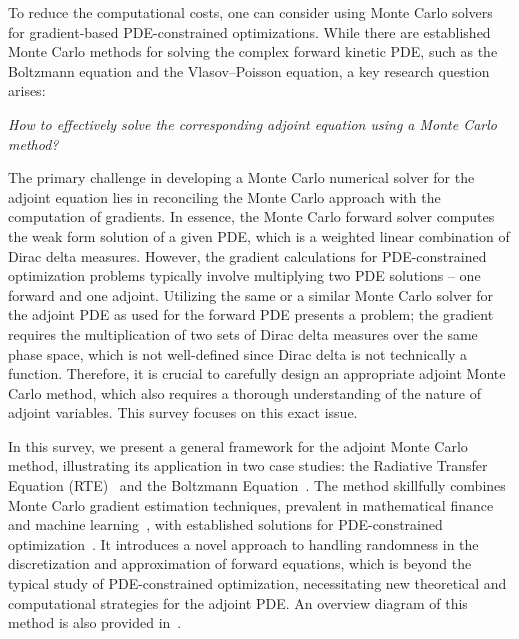 \documentclass[12pt]{amsart}
\begin{document}
To reduce the computational costs, one can consider using Monte Carlo solvers for gradient-based PDE-constrained optimizations. While there are established Monte Carlo methods for solving the complex forward kinetic PDE, such as the Boltzmann equation and the Vlasov--Poisson equation, a key research question arises: \newline
\begin{center}
\textit{How to effectively solve the corresponding adjoint equation using a Monte Carlo method? }
\end{center}






The primary challenge in developing a Monte Carlo numerical solver for the adjoint equation lies in reconciling the Monte Carlo approach with the computation of gradients. In essence, the Monte Carlo forward solver computes the weak form solution of a given PDE, which is  a weighted linear combination of Dirac delta measures. However, the gradient calculations for PDE-constrained optimization problems typically involve multiplying two PDE solutions – one forward and one adjoint. Utilizing the same or a similar Monte Carlo solver for the adjoint PDE as used for the forward PDE presents a problem; the gradient requires the multiplication of two sets of Dirac delta measures over the same phase space, which is not well-defined since Dirac delta is not technically a function. Therefore, it is crucial to carefully design an appropriate adjoint Monte Carlo method, which also requires a thorough understanding of the nature of adjoint variables. This survey focuses on this exact issue. 


In this survey, we present a  general framework for the adjoint Monte Carlo method, illustrating its application in two case studies: the Radiative Transfer Equation (RTE)~\cite{li2022monte} and the Boltzmann Equation~\cite{caflisch2021adjoint,yang2023adjoint}. The method skillfully combines Monte Carlo gradient estimation techniques, prevalent in mathematical finance and machine learning~\cite{glasserman2013monte,mohamed2019monte}, with established solutions for PDE-constrained optimization~\cite{herty2007optimal}. It introduces a novel approach to handling randomness in the discretization and approximation of forward equations, which is beyond the typical study of PDE-constrained optimization, necessitating new theoretical and computational strategies for the adjoint PDE. An overview diagram of this method is also provided in~.
\end{document}
